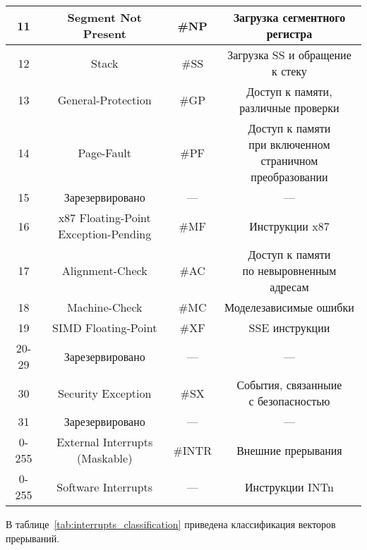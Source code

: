 \begin{center}
\begin{longtable}{|c|c|c|c|}
    \hline
    11  & Segment Not Present & \#NP & \makecell{Загрузка сегментного \\ регистра} \\
    \hline
    12  & Stack & \#SS & \makecell{Загрузка SS и обращение \\ к стеку} \\
    \hline
    13  & General-Protection & \#GP & \makecell{Доступ к памяти, \\ различные проверки} \\
    \hline
    14  & Page-Fault & \#PF & \makecell{Доступ к памяти \\ при включенном страничном \\
    преобразовании} \\
    \hline
    15  & Зарезервировано & --- & --- \\
    \hline
    16  & \makecell{x87 Floating-Point \\ Exception-Pending} & \#MF & Инструкции x87 \\
    \hline
    17  & Alignment-Check & \#AC & \makecell{Доступ к памяти \\ по невыровненным адресам} \\
    \hline
    18  & Machine-Check & \#MC & Моделезависимые ошибки \\
    \hline
    19  & SIMD Floating-Point & \#XF & SSE инструкции \\
    \hline
    20-29  & Зарезервировано & --- & --- \\
    \hline
    30  & Security Exception & \#SX & \makecell{События, связанныие \\ с безопасностью} \\
    \hline
    31  & Зарезервировано & --- & --- \\
    \hline
    0-255  & \makecell{External Interrupts \\ (Maskable)} & \#INTR & Внешние прерывания \\
    \hline
    0-255  & Software Interrupts & --- & Инструкции INTn \\
    \hline
  \end{longtable}
\end{center}

В таблице~\ref{tab:interrupts_classification} приведена классификация векторов
прерываний.

